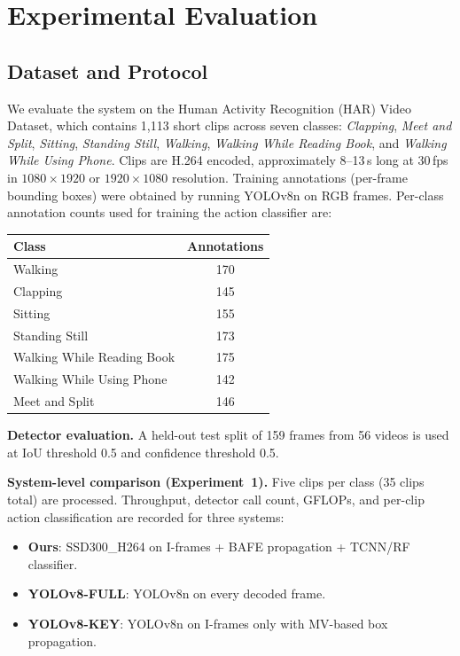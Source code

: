 \documentclass[conference]{IEEEtran}
\begin{document}
\section{Experimental Evaluation}

\subsection{Dataset and Protocol}
\label{sec:protocol}

We evaluate the system on the Human Activity Recognition (HAR) Video Dataset, which contains 1{,}113 short clips across seven classes:
\textit{Clapping}, \textit{Meet and Split}, \textit{Sitting}, \textit{Standing Still}, \textit{Walking}, \textit{Walking While Reading Book}, and \textit{Walking While Using Phone}.
Clips are H.264 encoded, approximately 8--13\,s long at 30\,fps in $1080\!\times\!1920$ or $1920\!\times\!1080$ resolution. Training annotations (per-frame bounding boxes) were obtained by running YOLOv8n on RGB frames. Per-class annotation counts used for training the action classifier are:

\begin{center}
\small
\begin{tabular}{lc}
\toprule
Class & Annotations \\
\midrule
Walking & 170 \\
Clapping & 145 \\
Sitting & 155 \\
Standing Still & 173 \\
Walking While Reading Book & 175 \\
Walking While Using Phone & 142 \\
Meet and Split & 146 \\
\bottomrule
\end{tabular}
\end{center}

\textbf{Detector evaluation.} A held-out test split of 159 frames from 56 videos is used at IoU threshold 0.5 and confidence threshold 0.5.

\textbf{System-level comparison (Experiment~1).} Five clips per class (35 clips total) are processed. Throughput, detector call count, GFLOPs, and per-clip action classification are recorded for three systems:
\begin{itemize}
  \item \textbf{Ours}: SSD300\_H264 on I-frames + BAFE propagation + TCNN/RF classifier.
  \item \textbf{YOLOv8-FULL}: YOLOv8n on every decoded frame.
  \item \textbf{YOLOv8-KEY}: YOLOv8n on I-frames only with MV-based box propagation.
\end{itemize}
\end{document}
